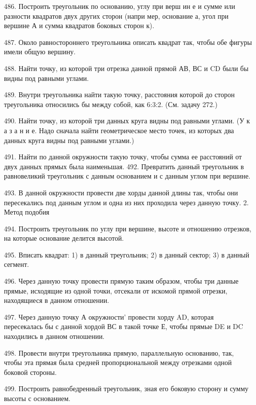 {486.                      Построить треугольник по основанию, углу при верш ин е и сумме или разности квадратов двух других сторон (напри мер, основание а, угол при вершине А и сумма квадратов боковых сторон к).

487.                      Около равностороннего треугольника описать квадрат так, чтобы обе фигуры имели общую вершину.

488.                     Найти точку, из которой три отрезка данной прямой АВ, ВС и CD были бы видны под равными углами.

489.                       Внутри треугольника найти такую точку, расстояния которой до сторон треугольника относились бы между собой, как 6:3:2. (См. задачу 272.)

490.                      Найти точку, из которой три данных круга видны под равными углами. (У к а з а н и е. Надо сначала найти геометрическое место точек, из которых два данных круга видны под равными углами.)

491.                      Найти по данной окружности такую точку, чтобы сумма ее расстояний от двух данных прямых была наименьшая.
492.                     Превратить данный треугольник в равновеликий треугольник с данным основанием и с данным углом при вершине.

493.                    В данной окружности провести две хорды данной длины так, чтобы они пересекались под данным углом и одна из них проходила через данную точку.
2. Метод подобия

494.                       Построить треугольник по углу при вершине, высоте и отношению отрезков, на которые основание делится высотой.

495.                    Вписать квадрат: 1) в данный треугольник; 2) в данный сектор; 3) в данный сегмент.

496.                      Через данную точку провести прямую таким образом, чтобы три данные прямые, исходящие из одной точки, отсекали от искомой прямой отрезки, находящиеся в данном отношении.

497.                     Через данную точку А окружности' провести хорду AD, которая пересекалась бы с данной хордой ВС в такой точке Е, чтобы прямые DE и DC находились в данном отношении.

498.                      Провести внутри треугольника прямую, параллельную основанию, так, чтобы эта прямая была средней пропорциональной между отрезками одной боковой стороны.

499.                      Построить равнобедренный треугольник, зная его боковую сторону и сумму высоты с основанием.

}
